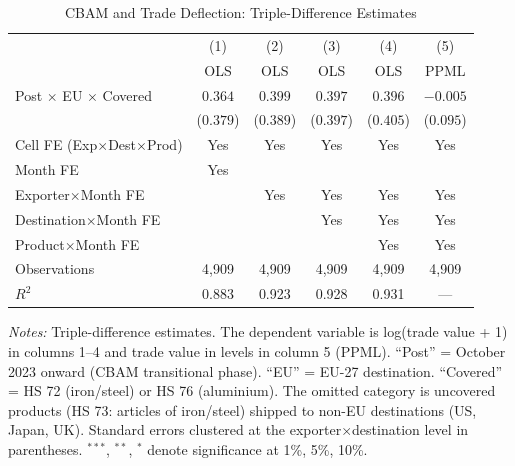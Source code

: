 \begin{table}[htbp]
\centering
\caption{CBAM and Trade Deflection: Triple-Difference Estimates}
\label{tab:main}
\begin{tabular}{lccccc}
\hline\hline
 & (1) & (2) & (3) & (4) & (5) \\
 & OLS & OLS & OLS & OLS & PPML \\
\hline
Post $\times$ EU $\times$ Covered & $0.364$ & $0.399$ & $0.397$ & $0.396$ & $-0.005$ \\
 & ($0.379$) & ($0.389$) & ($0.397$) & ($0.405$) & ($0.095$) \\
\hline
Cell FE (Exp$\times$Dest$\times$Prod) & Yes & Yes & Yes & Yes & Yes \\
Month FE & Yes & & & & \\
Exporter$\times$Month FE & & Yes & Yes & Yes & Yes \\
Destination$\times$Month FE & & & Yes & Yes & Yes \\
Product$\times$Month FE & & & & Yes & Yes \\
Observations & 4,909 & 4,909 & 4,909 & 4,909 & 4,909 \\
$R^2$ & 0.883 & 0.923 & 0.928 & 0.931 & --- \\
\hline\hline
\end{tabular}
\begin{tablenotes}[flushleft]
\small
\item \textit{Notes:} Triple-difference estimates. The dependent variable is log(trade value + 1) in columns 1--4 and trade value in levels in column 5 (PPML). ``Post'' = October 2023 onward (CBAM transitional phase). ``EU'' = EU-27 destination. ``Covered'' = HS 72 (iron/steel) or HS 76 (aluminium). The omitted category is uncovered products (HS 73: articles of iron/steel) shipped to non-EU destinations (US, Japan, UK). Standard errors clustered at the exporter$\times$destination level in parentheses. $^{***}$, $^{**}$, $^{*}$ denote significance at 1\%, 5\%, 10\%.
\end{tablenotes}
\end{table}
